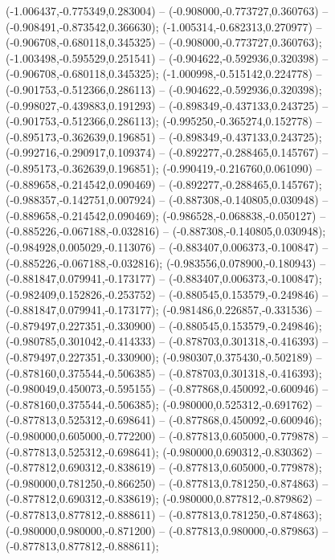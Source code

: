  (-1.006437,-0.775349,0.283004) -- (-0.908000,-0.773727,0.360763) -- (-0.908491,-0.873542,0.366630);
 (-1.005314,-0.682313,0.270977) -- (-0.906708,-0.680118,0.345325) -- (-0.908000,-0.773727,0.360763);
 (-1.003498,-0.595529,0.251541) -- (-0.904622,-0.592936,0.320398) -- (-0.906708,-0.680118,0.345325);
 (-1.000998,-0.515142,0.224778) -- (-0.901753,-0.512366,0.286113) -- (-0.904622,-0.592936,0.320398);
 (-0.998027,-0.439883,0.191293) -- (-0.898349,-0.437133,0.243725) -- (-0.901753,-0.512366,0.286113);
 (-0.995250,-0.365274,0.152778) -- (-0.895173,-0.362639,0.196851) -- (-0.898349,-0.437133,0.243725);
 (-0.992716,-0.290917,0.109374) -- (-0.892277,-0.288465,0.145767) -- (-0.895173,-0.362639,0.196851);
 (-0.990419,-0.216760,0.061090) -- (-0.889658,-0.214542,0.090469) -- (-0.892277,-0.288465,0.145767);
 (-0.988357,-0.142751,0.007924) -- (-0.887308,-0.140805,0.030948) -- (-0.889658,-0.214542,0.090469);
 (-0.986528,-0.068838,-0.050127) -- (-0.885226,-0.067188,-0.032816) -- (-0.887308,-0.140805,0.030948);
 (-0.984928,0.005029,-0.113076) -- (-0.883407,0.006373,-0.100847) -- (-0.885226,-0.067188,-0.032816);
 (-0.983556,0.078900,-0.180943) -- (-0.881847,0.079941,-0.173177) -- (-0.883407,0.006373,-0.100847);
 (-0.982409,0.152826,-0.253752) -- (-0.880545,0.153579,-0.249846) -- (-0.881847,0.079941,-0.173177);
 (-0.981486,0.226857,-0.331536) -- (-0.879497,0.227351,-0.330900) -- (-0.880545,0.153579,-0.249846);
 (-0.980785,0.301042,-0.414333) -- (-0.878703,0.301318,-0.416393) -- (-0.879497,0.227351,-0.330900);
 (-0.980307,0.375430,-0.502189) -- (-0.878160,0.375544,-0.506385) -- (-0.878703,0.301318,-0.416393);
 (-0.980049,0.450073,-0.595155) -- (-0.877868,0.450092,-0.600946) -- (-0.878160,0.375544,-0.506385);
 (-0.980000,0.525312,-0.691762) -- (-0.877813,0.525312,-0.698641) -- (-0.877868,0.450092,-0.600946);
 (-0.980000,0.605000,-0.772200) -- (-0.877813,0.605000,-0.779878) -- (-0.877813,0.525312,-0.698641);
 (-0.980000,0.690312,-0.830362) -- (-0.877812,0.690312,-0.838619) -- (-0.877813,0.605000,-0.779878);
 (-0.980000,0.781250,-0.866250) -- (-0.877813,0.781250,-0.874863) -- (-0.877812,0.690312,-0.838619);
 (-0.980000,0.877812,-0.879862) -- (-0.877813,0.877812,-0.888611) -- (-0.877813,0.781250,-0.874863);
 (-0.980000,0.980000,-0.871200) -- (-0.877813,0.980000,-0.879863) -- (-0.877813,0.877812,-0.888611);
